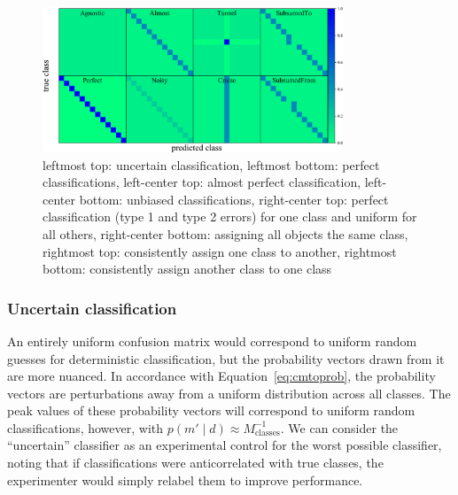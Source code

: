 \begin{figure}
	\begin{center}
    \includegraphics[width=0.8\textwidth]{./fig/all_sim_cm.png}
		\caption{leftmost top: uncertain classification,
    leftmost bottom: perfect classifications,
    left-center top: almost perfect classification,
    left-center bottom: unbiased classifications,
    right-center top: perfect classification (type 1 and type 2 errors) for one class and uniform for all others,
    right-center bottom: assigning all objects the same class,
    rightmost top: consistently assign one class to another,
    rightmost bottom: consistently assign another class to one class}
		\label{fig:mock_cm}
	\end{center}
\end{figure}

\subsubsection{Uncertain classification}
\label{sec:uncertaindata}

An entirely uniform confusion matrix would correspond to uniform random guesses for deterministic classification, but the probability vectors drawn from it are more nuanced.
In accordance with Equation~\ref{eq:cmtoprob}, the probability vectors are perturbations away from a  uniform distribution across all classes.
The peak values of these probability vectors will correspond to uniform random classifications, however, with $p(m' \mid d)\approx M_{\mathrm{classes}}^{-1}$.
We can consider the ``uncertain'' classifier as an experimental control for the worst possible classifier, noting that if classifications were anticorrelated with true classes, the experimenter would simply relabel them to improve performance.

